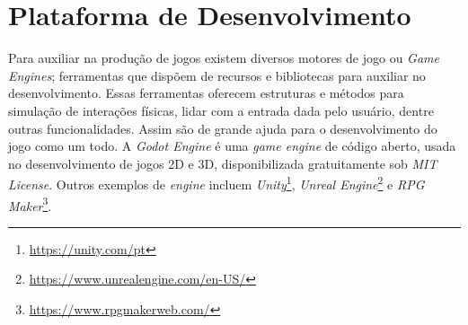 













\chapter{Plataforma de Desenvolvimento}
\label{cap:godot}

Para auxiliar na produção de jogos existem diversos motores de jogo ou \textit{Game Engines}; ferramentas que dispõem de recursos e bibliotecas para auxiliar no desenvolvimento. Essas ferramentas oferecem estruturas e métodos para simulação de interações físicas, lidar com a entrada dada pelo usuário, dentre outras funcionalidades. Assim são de grande ajuda para o desenvolvimento do jogo como um todo. A \textit{Godot Engine} é uma  \textit{game engine} de código aberto, usada no desenvolvimento de jogos 2D e 3D, disponibilizada gratuitamente sob \textit{MIT License}. Outros exemplos de \textit{engine} incluem \textit{Unity}\footnote{\url{https://unity.com/pt}}, \textit{Unreal Engine}\footnote{\url{https://www.unrealengine.com/en-US/}} e \textit{RPG Maker}\footnote{\url{https://www.rpgmakerweb.com/}}.


